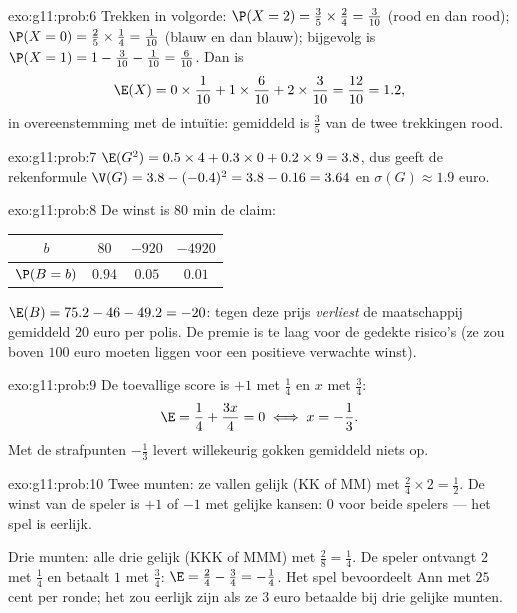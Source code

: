 \begin{solution}{exo:g11:prob:6}
Trekken in volgorde: $\P(X = 2) = \frac35 \times \frac24 = \frac{3}{10}$
(rood en dan rood); $\P(X = 0) = \frac25 \times \frac14 = \frac{1}{10}$
(blauw en dan blauw); bijgevolg is
$\P(X = 1) = 1 - \frac{3}{10} - \frac{1}{10} = \frac{6}{10}$. Dan is
\[
\E(X) = 0 \times \frac1{10} + 1 \times \frac6{10} + 2 \times \frac3{10}
= \frac{12}{10} = 1.2 ,
\]
in overeenstemming met de intuïtie: gemiddeld is $\frac35$ van de twee
trekkingen rood.
\end{solution}

\begin{solution}{exo:g11:prob:7}
$\E(G^2) = 0.5 \times 4 + 0.3 \times 0 + 0.2 \times 9 = 3.8$, dus geeft de
rekenformule $\V(G) = 3.8 - (-0.4)^2 = 3.8 - 0.16 = 3.64$ en
$\sigma(G) \approx 1.9$ euro.
\end{solution}

\begin{solution}{exo:g11:prob:8}
De winst is $80$ min de claim:
\begin{center}
\begin{tabular}{c|ccc}
$b$ & $80$ & $-920$ & $-4920$\\
\hline
$\P(B=b)$ & $0.94$ & $0.05$ & $0.01$
\end{tabular}
\end{center}
$\E(B) = 75.2 - 46 - 49.2 = -20$: tegen deze prijs \emph{verliest} de
maatschappij gemiddeld $20$ euro per polis. De premie is te laag voor de
gedekte risico's (ze zou boven $100$ euro moeten liggen voor een positieve
verwachte winst).
\end{solution}

\begin{solution}{exo:g11:prob:9}
De toevallige score is $+1$ met  $\frac14$ en $x$ met  $\frac34$:
\[
\E = \frac14 + \frac{3x}{4} = 0 \iff x = -\frac13 .
\]
Met de strafpunten $-\frac13$ levert willekeurig gokken gemiddeld niets op.
\end{solution}

\begin{solution}{exo:g11:prob:10}
Twee munten: ze vallen gelijk (KK of MM) met 
$\frac24 \times 2 = \frac12$. De winst van de speler is $+1$ of $-1$ met
gelijke kansen:  $0$ voor beide spelers --- het spel is
eerlijk.

Drie munten: alle drie gelijk (KKK of MMM) met 
$\frac{2}{8} = \frac14$. De speler ontvangt $2$ met  $\frac14$ en betaalt
$1$ met  $\frac34$: $\E = \frac24 - \frac34 = -\frac14$. Het spel
bevoordeelt Ann met $25$ cent per ronde; het zou eerlijk zijn als ze $3$ euro
betaalde bij drie gelijke munten.
\end{solution}

